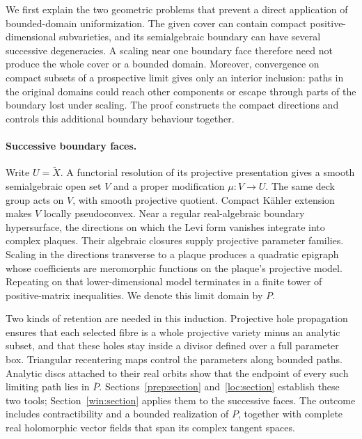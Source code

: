 \documentclass[11pt]{article}
\theoremstyle{definition}
\theoremstyle{remark}
\begin{document}
We first explain the two geometric problems that prevent a direct
application of bounded-domain uniformization. The given cover can
contain compact positive-dimensional subvarieties, and its
semialgebraic boundary can have several successive degeneracies.
A scaling near one boundary face therefore need not produce the
whole cover or a bounded domain. Moreover, convergence on compact
subsets of a prospective limit gives only an interior inclusion:
paths in the original domains could reach other components or
escape through parts of the boundary lost under scaling. The proof
constructs the compact directions and controls this additional
boundary behaviour together.

\paragraph{Successive boundary faces.}
Write \(U=\widetilde X\). A functorial resolution of its projective
presentation gives a smooth semialgebraic open set \(V\) and a
proper modification \(\mu:V\to U\). The same deck group acts on
\(V\), with smooth projective quotient. Compact K\"ahler extension
makes \(V\) locally pseudoconvex. Near a regular real-algebraic
boundary hypersurface, the directions on which the Levi form
vanishes integrate into complex plaques. Their algebraic closures
supply projective parameter families. Scaling in the directions
transverse to a plaque produces a quadratic epigraph whose
coefficients are meromorphic functions on the plaque's projective
model. Repeating on that lower-dimensional model terminates in a
finite tower of positive-matrix inequalities. We denote this limit
domain by \(P\).

Two kinds of retention are needed in this induction. Projective
hole propagation ensures that each selected fibre is a whole
projective variety minus an analytic subset, and that these holes
stay inside a divisor defined over a full parameter box. Triangular
recentering maps control the parameters along bounded paths.
Analytic discs attached to their real orbits show that the endpoint
of every such limiting path lies in \(\overline P\).
Sections~\ref{prep:section} and~\ref{loc:section} establish these
two tools; Section~\ref{win:section} applies them to the successive
faces. The outcome includes contractibility and a bounded
realization of \(P\), together with complete real holomorphic vector
fields that span its complex tangent spaces.
\end{document}
